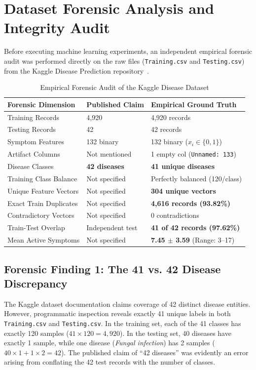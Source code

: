 \section{Dataset Forensic Analysis and Integrity Audit}
\label{sec:dataset_forensics}

Before executing machine learning experiments, an independent empirical forensic audit was performed directly on the raw files (\texttt{Training.csv} and \texttt{Testing.csv}) from the Kaggle Disease Prediction repository~\cite{kaushil2020kaggle}.

\begin{table}[t]
\caption{Empirical Forensic Audit of the Kaggle Disease Dataset}
\label{tab:forensic_summary}
\centering
\begin{tabular}{lll}
\toprule
\textbf{Forensic Dimension} & \textbf{Published Claim} & \textbf{Empirical Ground Truth} \\
\midrule
Training Records & 4,920 & 4,920 records \\
Testing Records & 42 & 42 records \\
Symptom Features & 132 binary & 132 binary ($x_i \in \{0, 1\}$) \\
Artifact Columns & Not mentioned & 1 empty col (\texttt{Unnamed: 133}) \\
Disease Classes & \textbf{42 diseases} & \textbf{41 unique diseases} \\
Training Class Balance & Not specified & Perfectly balanced (120/class) \\
Unique Feature Vectors & Not specified & \textbf{304 unique vectors} \\
Exact Train Duplicates & Not specified & \textbf{4,616 records (93.82\%)} \\
Contradictory Vectors & Not specified & 0 contradictions \\
Train-Test Overlap & Independent test & \textbf{41 of 42 records (97.62\%)} \\
Mean Active Symptoms & Not specified & \textbf{7.45 $\pm$ 3.59} (Range: 3--17) \\
\bottomrule
\end{tabular}
\end{table}

\subsection{Forensic Finding 1: The 41 vs. 42 Disease Discrepancy}
The Kaggle dataset documentation claims coverage of 42 distinct disease entities. However, programmatic inspection reveals exactly 41 unique labels in both \texttt{Training.csv} and \texttt{Testing.csv}. In the training set, each of the 41 classes has exactly 120 samples ($41 \times 120 = 4,920$). In the testing set, 40 diseases have exactly 1 sample, while one disease (\emph{Fungal infection}) has 2 samples ($40 \times 1 + 1 \times 2 = 42$). The published claim of ``42 diseases'' was evidently an error arising from conflating the 42 test records with the number of classes.

